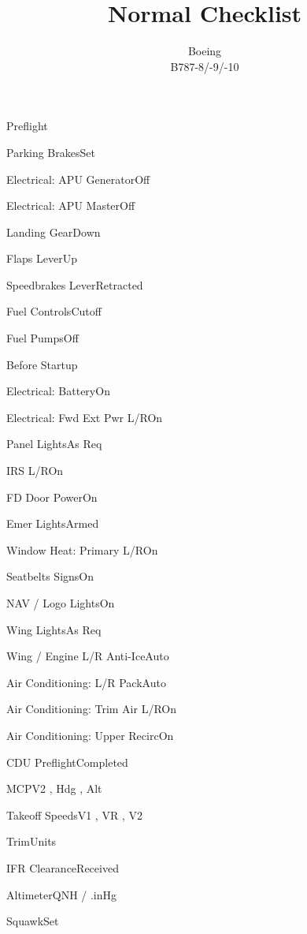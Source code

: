 \documentclass[sim-use]{checklist}
\title{Normal Checklist}
\subtitle{Boeing \\ B787-8/-9/-10}
\begin{document}
  

\begin{checklist}{Preflight}
  \item{Parking Brakes}{Set}
  \item{Electrical: APU Generator}{Off}
  \item{Electrical: APU Master}{Off}
  \item{Landing Gear}{Down}
  \item{Flaps Lever}{Up}
  \item{Speedbrakes Lever}{Retracted}
  \item{Fuel Controls}{Cutoff}
  \item{Fuel Pumps}{Off}
\end{checklist}

\begin{checklist}{Before Startup}
  \item{Electrical: Battery}{On}
  \item{Electrical: Fwd Ext Pwr L/R}{On}
  \item{Panel Lights}{As Req}
  \item{IRS L/R}{On}
  \item{FD Door Power}{On}
  \item{Emer Lights}{Armed}
  \item{Window Heat: Primary L/R}{On}
  \item{Seatbelts Signs}{On}
  \item{NAV / Logo Lights}{On}
  \item{Wing Lights}{As Req}
  \item{Wing / Engine L/R Anti-Ice}{Auto}
  \item{Air Conditioning: L/R Pack}{Auto}
  \item{Air Conditioning: Trim Air L/R}{On}
  \item{Air Conditioning: Upper Recirc}{On}
  \item{CDU Preflight}{Completed}
  \item{MCP}{V2 \blank, Hdg \blank, Alt \blank}
  \item{Takeoff Speeds}{V1 \blank, VR \blank, V2 \blank}
  \item{Trim}{\blank Units}
  \item{IFR Clearance}{Received}
  \item{Altimeter}{\blank QNH / \blank.\blank inHg}
  \item{Squawk}{Set}
\end{checklist}
\end{document}
